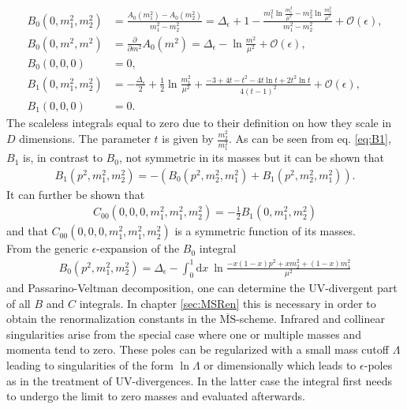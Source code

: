 \begin{align}
B_0(0,m_1^2,m_2^2) &= \frac{A_0(m_1^2)-A_0(m_2^2)}{m_1^2-m_2^2} = \Delta_\epsilon + 1 -\frac{m_1^2\ln \frac{m_1^2}{\mu^2}-m_2^2\ln \frac{m_2^2}{\mu^2}}{m_1^2-m_2^2} + \mathcal{O}(\epsilon),\\
B_0(0,m^2,m^2) &= \frac{\partial}{\partial m^2} A_0(m^2) = \Delta_\epsilon -\ln \frac{m^2}{\mu^2} + \mathcal{O}(\epsilon),\\
B_0(0,0,0) &= 0,\\
B_1(0,m_1^2,m_2^2) &= -\frac{\Delta_\epsilon}{2} + \frac{1}{2}\ln \frac{m_1^2}{\mu^2} + \frac{-3+4t-t^2-4t \ln t +2t^2 \ln t}{4(t-1)^2} + \mathcal{O}(\epsilon),\label{eq:B1}\\
B_1(0,0,0) &= 0.
\end{align}
The scaleless integrals equal to zero due to their definition on how they scale in $D$ dimensions\cite{Collins:105730}. The parameter $t$ is given by $\frac{m_2^2}{m_1^2}$. As can be seen from eq. \eqref{eq:B1}, $B_1$ is, in contrast to $B_0$, not symmetric in its masses but it can be shown\cite{Romao} that
\begin{align}
B_1(p^2,m_1^2,m_2^2) = -(B_0(p^2,m_2^2,m_1^2) + B_1(p^2,m_2^2,m_1^2)).
\end{align}
It can further be shown that
\begin{align}
C_{00}(0,0,0,m_1^2, m_1^2, m_2^2) = -\frac{1}{2}B_1(0, m_1^2, m_2^2)
\end{align} and that $C_{00}(0,0,0,m_1^2, m_1^2, m_2^2)$ is a symmetric function of its masses.\\
From the generic $\epsilon$-expansion of the $B_0$ integral \cite{Denner}
\begin{align}
B_0(p^2,m_1^2,m_2^2) = \Delta_\epsilon - \int_0^1\mathrm{d}x\ \ln \frac{-x(1-x)p^2 + xm_2^2 + (1-x)m_1^2}{\mu^2}
\end{align} 
and Passarino-Veltman decomposition, \cite{Passarino:1978jh} one can determine the UV-divergent part of all $B$ and $C$ integrals. In chapter \ref{sec:MSRen} this is necessary in order to obtain the renormalization constants in the $\overline{\mathrm{MS}}$-scheme. Infrared and collinear singularities arise from the special case where one or multiple masses and momenta tend to zero. These poles can be regularized with a small mass cutoff $\Lambda$ leading to singularities of the form $\ln \Lambda$ or dimensionally which leads to $\epsilon$-poles as in the treatment of UV-divergences. In the latter case the integral first needs to undergo the limit to zero masses and evaluated afterwards.\\
